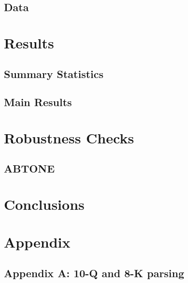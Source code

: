 \documentclass[a4paper]{article}
\begin{document}
\begin{spacing}{2}
\subsection{Data}

\section{Results}

\subsection{Summary Statistics}

\subsection{Main Results}

\section{Robustness Checks}

\subsection{ABTONE}

\section{Conclusions}

\end{spacing}

\newpage
\section{Appendix}
\subsection{Appendix A: 10-Q and 8-K parsing}
\end{document}
